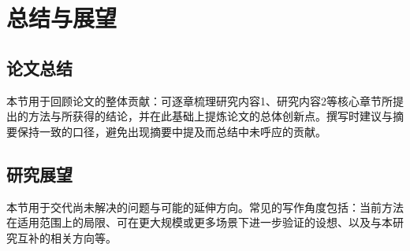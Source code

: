 \clearpage


\section{总结与展望}

\subsection{论文总结}

本节用于回顾论文的整体贡献：可逐章梳理研究内容1、研究内容2等核心章节所提出的方法与所获得的结论，并在此基础上提炼论文的总体创新点。撰写时建议与摘要保持一致的口径，避免出现摘要中提及而总结中未呼应的贡献。

\subsection{研究展望}

本节用于交代尚未解决的问题与可能的延伸方向。常见的写作角度包括：当前方法在适用范围上的局限、可在更大规模或更多场景下进一步验证的设想、以及与本研究互补的相关方向等。

